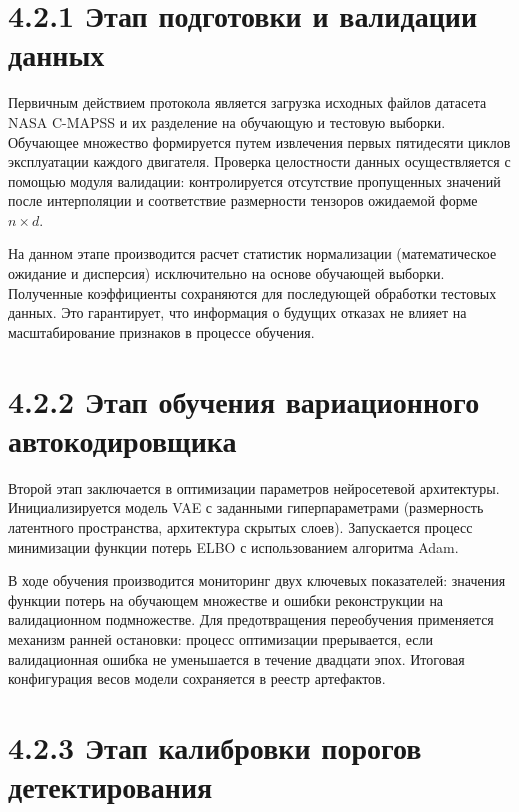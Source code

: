 \documentclass[14pt, a4paper, oneside]{extreport}
\begin{document}
\vspace{1em}
\section{4.2.1 Этап подготовки и валидации данных}
\vspace{1em}

Первичным действием протокола является загрузка исходных файлов датасета NASA C-MAPSS и их разделение на обучающую и тестовую выборки. Обучающее множество формируется путем извлечения первых пятидесяти циклов эксплуатации каждого двигателя. Проверка целостности данных осуществляется с помощью модуля валидации: контролируется отсутствие пропущенных значений после интерполяции и соответствие размерности тензоров ожидаемой форме $n \times d$.

На данном этапе производится расчет статистик нормализации (математическое ожидание и дисперсия) исключительно на основе обучающей выборки. Полученные коэффициенты сохраняются для последующей обработки тестовых данных. Это гарантирует, что информация о будущих отказах не влияет на масштабирование признаков в процессе обучения.

\vspace{1em}
\section{4.2.2 Этап обучения вариационного автокодировщика}
\vspace{1em}

Второй этап заключается в оптимизации параметров нейросетевой архитектуры. Инициализируется модель VAE с заданными гиперпараметрами (размерность латентного пространства, архитектура скрытых слоев). Запускается процесс минимизации функции потерь ELBO с использованием алгоритма Adam.

В ходе обучения производится мониторинг двух ключевых показателей: значения функции потерь на обучающем множестве и ошибки реконструкции на валидационном подмножестве. Для предотвращения переобучения применяется механизм ранней остановки: процесс оптимизации прерывается, если валидационная ошибка не уменьшается в течение двадцати эпох. Итоговая конфигурация весов модели сохраняется в реестр артефактов.

\vspace{1em}
\section{4.2.3 Этап калибровки порогов детектирования}
\vspace{1em}
\end{document}
